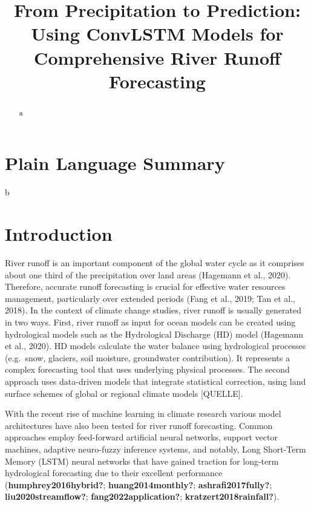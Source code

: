 \documentclass[
]{agujournal2019}
\begin{document}
\title{From Precipitation to Prediction: Using ConvLSTM Models for
Comprehensive River Runoff Forecasting}



\begin{abstract}
a
\end{abstract}

\section*{Plain Language Summary}
b


\ifdefined\Shaded\renewenvironment{Shaded}{\begin{tcolorbox}[interior hidden, enhanced, boxrule=0pt, breakable, borderline west={3pt}{0pt}{shadecolor}, sharp corners, frame hidden]}{\end{tcolorbox}}\fi

\hypertarget{introduction}{%
\section{Introduction}\label{introduction}}

River runoff is an important component of the global water cycle as it
comprises about one third of the precipitation over land areas (Hagemann
et al., 2020). Therefore, accurate runoff forecasting is crucial for
effective water resources management, particularly over extended periods
(Fang et al., 2019; Tan et al., 2018). In the context of climate change
studies, river runoff is usually generated in two ways. First, river
runoff as input for ocean models can be created using hydrological
models such as the Hydrological Discharge (HD) model (Hagemann et al.,
2020). HD models calculate the water balance using hydrological
processes (e.g.~snow, glaciers, soil moisture, groundwater
contribution). It represents a complex forecasting tool that uses
underlying physical processes. The second approach uses data-driven
models that integrate statistical correction, using land surface schemes
of global or regional climate models {[}QUELLE{]}.

With the recent rise of machine learning in climate research various
model architectures have also been tested for river runoff forecasting.
Common approaches employ feed-forward artificial neural networks,
support vector machines, adaptive neuro-fuzzy inference systems, and
notably, Long Short-Term Memory (LSTM) neural networks that have gained
traction for long-term hydrological forecasting due to their excellent
performance (\textbf{humphrey2016hybrid?}; \textbf{huang2014monthly?};
\textbf{ashrafi2017fully?}; \textbf{liu2020streamflow?};
\textbf{fang2022application?}; \textbf{kratzert2018rainfall?}).
\end{document}

